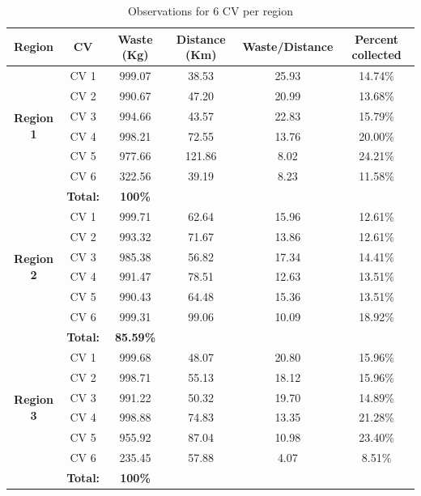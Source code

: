 \documentclass[12pt]{article}
\begin{document}
\begin{table}[H]
    \centering
    \caption{Observations for 6 CV per region} \label{tab2}
    \vspace*{0.3cm}
    \begin{tabular}{|c|ccccc|}
    \hline
        \rowcolor{Gray1}\textbf{Region} & \textbf{CV} & \textbf{Waste (Kg)} & \textbf{Distance (Km)} & \textbf{Waste/Distance} & \textbf{Percent collected} \\
        \hline \multirow{6}{*}{\textbf{Region 1}} & CV 1 & 999.07& 38.53 & 25.93 &14.74\% \\
        & CV 2 & 990.67 & 47.20 & 20.99 & 13.68\%\\        
        & CV 3 & 994.66 & 43.57 & 22.83 & 15.79\%\\        
        & CV 4 & 998.21 & 72.55 & 13.76 & 20.00\%\\      
        & CV 5 & 977.66 & 121.86 & 8.02 & 24.21\%\\      
        & CV 6 & 322.56 & 39.19 & 8.23 & 11.58\%\\
        \hline\rowcolor{Gray2} \multicolumn{4}{|c}{}&\textbf{Total:} &\textbf{100\%}\\
        \hline \multirow{6}{*}{\textbf{Region 2}} & CV 1 & 999.71 & 62.64 & 15.96 & 12.61\% \\
        & CV 2 & 993.32 & 71.67 & 13.86 & 12.61\%\\        
        & CV 3 & 985.38 & 56.82 & 17.34 & 14.41\%\\        
        & CV 4 & 991.47 & 78.51 & 12.63 & 13.51\%\\        
        & CV 5 & 990.43 & 64.48 & 15.36 & 13.51\%\\        
        & CV 6 & 999.31 & 99.06 & 10.09 & 18.92\%\\
        \hline \rowcolor{Gray2}  \multicolumn{4}{|c}{}&\textbf{Total:} &\textbf{85.59\%}\\     
        \hline \multirow{6}{*}{\textbf{Region 3}} & CV 1 & 999.68 & 48.07 & 20.80 & 15.96\% \\
        & CV 2 & 998.71 & 55.13 & 18.12 & 15.96\%\\        
        & CV 3 & 991.22 & 50.32 & 19.70 & 14.89\%\\        
        & CV 4 & 998.88 & 74.83 & 13.35 & 21.28\%\\      
        & CV 5 & 955.92 & 87.04 & 10.98 & 23.40\%\\      
        & CV 6 & 235.45 & 57.88 & 4.07 & 8.51\%\\
        \hline\rowcolor{Gray2}  \multicolumn{4}{|c}{}&\textbf{Total:} &\textbf{100\%}\\
        \hline  
    \end{tabular}
\end{table}
\end{document}
